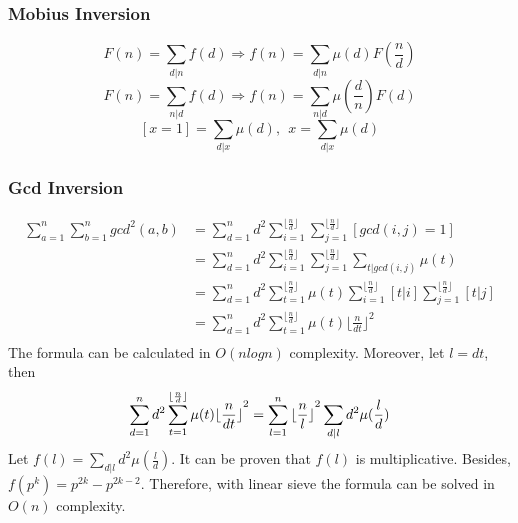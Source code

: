 \def \bangle{ \atopwithdelims \langle \rangle}
\providecommand{\myfloor}[1]{ \lfloor #1 \rfloor }
\begin{small}
\subsubsection{Mobius Inversion}
\[F(n)=\sum_{d|n}f(d)\Rightarrow f(n)=\sum_{d|n}\mu(d)F(\frac{n}{d})\]
\[F(n)=\sum_{n|d}f(d)\Rightarrow f(n)=\sum_{n|d}\mu(\frac{d}{n})F(d)\]
\[[x = 1] = \sum_{d|x}\mu(d),\ \ x = \sum_{d|x}\mu(d)\]

\subsubsection{Gcd Inversion}
\begin{equation*}
\begin{aligned}
\sum_{a=1}^n\sum_{b=1}^ngcd^2(a,b) & =\sum_{d=1}^nd^2\sum_{i=1}^{\myfloor{\frac{n}{d}}}\sum_{j=1}^{\myfloor{\frac{n}{d}}}[gcd(i,j)=1]\\
 & =\sum_{d=1}^nd^2\sum_{i=1}^{\myfloor{\frac{n}{d}}}\sum_{j=1}^{\myfloor{\frac{n}{d}}}\sum_{t|gcd(i,j)}\mu(t)\\
 & =\sum_{d=1}^nd^2\sum_{t=1}^{\myfloor{\frac{n}{d}}}\mu(t)\sum_{i=1}^{\myfloor{\frac{n}{d}}}[t|i]\sum_{j=1}^{\myfloor{\frac{n}{d}}}[t|j]\\
 & =\sum_{d=1}^nd^2\sum_{t=1}^{\myfloor{\frac{n}{d}}}\mu(t){\myfloor{\frac{n}{dt}}}^2\\
\end{aligned}
\end{equation*}
The formula can be calculated in $O(nlogn)$ complexity. Moreover, let $l=dt$, then
\begin{equation*}
\sum_{d=1}^nd^2\sum_{t=1}^{\myfloor{\frac{n}{d}}}\mu(t){\myfloor{\frac{n}{dt}}}^2=\sum_{l=1}^n{\myfloor{\frac{n}{l}}}^2\sum_{d|l}d^2\mu(\frac{l}{d})\\
\end{equation*}
Let $f(l)=\sum_{d|l}d^2\mu(\frac{l}{d})$. It can be proven that $f(l)$ is multiplicative. Besides, $f(p^k)=p^{2k}-p^{2k-2}$.
Therefore, with linear sieve the formula can be solved in $O(n)$ complexity.


\end{small}
